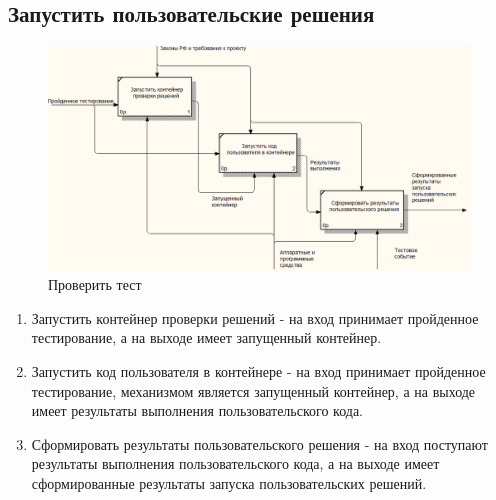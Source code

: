     \subsection{Запустить пользовательские решения}
    \begin{figure}[H]
        \includegraphics[width=\textwidth, center]{../img/idef0/RunUserSolutionsDecompose.png}
        \caption{Проверить тест}
    \end{figure}
    \begin{enumerate}
        \item Запустить контейнер проверки решений - на вход принимает пройденное тестирование, а на выходе имеет запущенный контейнер.
        \item Запустить код пользователя в контейнере - на вход принимает пройденное тестирование, механизмом является запущенный контейнер, а на выходе имеет результаты выполнения пользовательского кода.
        \item Сформировать результаты пользовательского решения - на вход поступают результаты выполнения пользовательского кода, а на выходе имеет сформированные результаты запуска пользовательских решений.
    \end{enumerate}